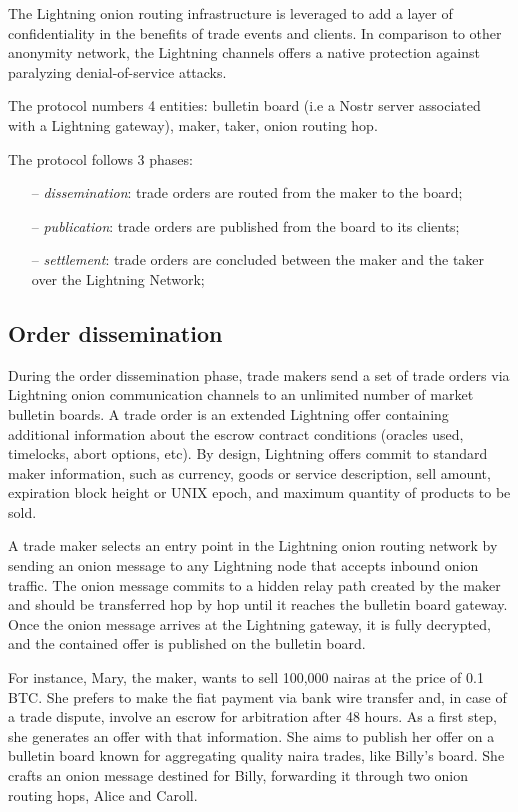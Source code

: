 \documentclass[pdflatex,sn-mathphys]{sn-jnl}%
\theoremstyle{thmstyleone}%
\theoremstyle{thmstyletwo}%
\theoremstyle{thmstylethree}%
\begin{document}
The Lightning onion routing infrastructure is leveraged to add a layer of confidentiality in the benefits of trade events and clients. In comparison to other anonymity network, the Lightning
channels offers a native protection against paralyzing denial-of-service attacks.

The protocol numbers 4 entities: bulletin board (i.e a Nostr server associated with a Lightning gateway), maker, taker, onion routing hop.

The protocol follows 3 phases:
\begin{itemize}
    \item[--] \textit{dissemination}: trade orders are routed from the maker to the board;
    \item[--] \textit{publication}: trade orders are published from the board to its clients;
    \item[--] \textit{settlement}: trade orders are concluded between the maker and the taker over the Lightning Network;
\end{itemize}

\subsection{Order dissemination}

During the order dissemination phase, trade makers send a set of trade orders via Lightning onion communication channels to an unlimited number of market bulletin boards. A trade order is an extended Lightning offer containing additional information about the escrow contract conditions (oracles used, timelocks, abort options, etc). By design, Lightning offers commit to standard maker information, such as currency, goods or service description, sell amount, expiration block height or UNIX epoch, and maximum quantity of products to be sold.

A trade maker selects an entry point in the Lightning onion routing network by sending an onion message to any Lightning node that accepts inbound onion traffic. The onion message commits to a hidden relay path created by the maker and should be transferred hop by hop until it reaches the bulletin board gateway. Once the onion message arrives at the Lightning gateway, it is fully decrypted, and the contained offer is published on the bulletin board.

For instance, Mary, the maker, wants to sell 100,000 nairas at the price of 0.1 BTC. She prefers to make the fiat payment via bank wire transfer and, in case of a trade dispute, involve an escrow for arbitration after 48 hours. As a first step, she generates an offer with that information. She aims to publish her offer on a bulletin board known for aggregating quality naira trades, like Billy's board. She crafts an onion message destined for Billy, forwarding it through two onion routing hops, Alice and Caroll.
\end{document}
